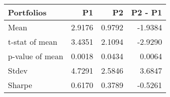 \begin{tabular}{lrrr}
\toprule
Portfolios & P1 & P2 & P2 - P1 \\
\midrule
Mean & 2.9176 & 0.9792 & -1.9384 \\
t-stat of mean & 3.4351 & 2.1094 & -2.9290 \\
p-value of mean & 0.0018 & 0.0434 & 0.0064 \\
Stdev & 4.7291 & 2.5846 & 3.6847 \\
Sharpe & 0.6170 & 0.3789 & -0.5261 \\
\bottomrule
\end{tabular}
